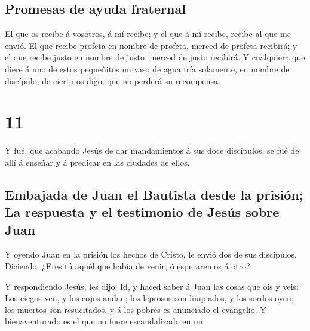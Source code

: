 \hypertarget{promesas-de-ayuda-fraternal}{%
\subsection{Promesas de ayuda
fraternal}\label{promesas-de-ayuda-fraternal}}

 El que os recibe á vosotros, á mí recibe; y el que á mí
recibe, recibe al que me envió.  El que recibe profeta en
nombre de profeta, merced de profeta recibirá; y el que recibe justo en
nombre de justo, merced de justo recibirá.  Y cualquiera
que diere á uno de estos pequeñitos un vaso de agua fría solamente, en
nombre de discípulo, de cierto os digo, que no perderá su recompensa.

\hypertarget{section-10}{%
\section{11}\label{section-10}}

 Y fué, que acabando Jesús de dar mandamientos á sus doce
discípulos, se fué de allí á enseñar y á predicar en las ciudades de
ellos.

\hypertarget{embajada-de-juan-el-bautista-desde-la-prisiuxf3n-la-respuesta-y-el-testimonio-de-jesuxfas-sobre-juan}{%
\subsection{Embajada de Juan el Bautista desde la prisión; La respuesta
y el testimonio de Jesús sobre
Juan}\label{embajada-de-juan-el-bautista-desde-la-prisiuxf3n-la-respuesta-y-el-testimonio-de-jesuxfas-sobre-juan}}

 Y oyendo Juan en la prisión los hechos de Cristo, le
envió dos de sus discípulos,  Diciendo: ¿Eres tú aquél que
había de venir, ó esperaremos á otro?

 Y respondiendo Jesús, les dijo: Id, y haced saber á Juan
las cosas que oís y veis:  Los ciegos ven, y los cojos
andan; los leprosos son limpiados, y los sordos oyen; los muertos son
resucitados, y á los pobres es anunciado el evangelio.  Y
bienaventurado es el que no fuere escandalizado en mí.

